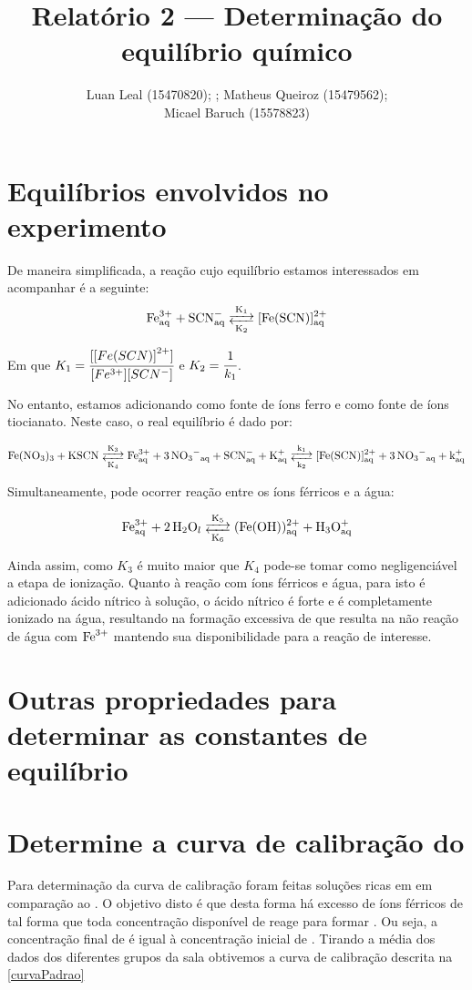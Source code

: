 \documentclass{article}
\author{Luan Leal (15470820);
; Matheus Queiroz (15479562);\\ Micael Baruch (15578823)}
\title{Relatório 2 --- Determinação do equilíbrio químico}
\begin{document}
\maketitle

\section{Equilíbrios envolvidos no experimento}

De maneira simplificada, a reação cujo equilíbrio estamos interessados em acompanhar é a seguinte:
\begin{align*}
    \ce{Fe^{3+}_{aq} + SCN^-_{aq} <-->[{K_1}][{K_2}] {[Fe(SCN)]}^{2+}_{aq}}
\end{align*}

Em que \(K_1 = \cfrac{[{[Fe(SCN)]}^{2+}]}{[Fe^{3+}][SCN^-]} \) e \(K_2 = \cfrac{1}{k_1}\).

No entanto, estamos adicionando  como fonte de íons ferro e  como fonte de íons tiocianato. Neste caso, o real equilíbrio é dado por:

\begin{align*}
    \ce{Fe(NO3)3 + KSCN <-->[{K_3}][{K_4}] Fe^{3+}_{aq} + 3NO3^-_{aq} + SCN^-_{aq} + K^+_{aq} <-->[{k_1}][{k_2}] {[Fe(SCN)]}^{2+}_{aq} + 3NO3^-_{aq} + k^+_{aq}}
\end{align*}

Simultaneamente, pode ocorrer reação entre os íons férricos e a água:

\begin{align*}
    \ce{Fe^{3+}_{aq} + 2H2O_l <-->[{K_5}][{K_6}] {(Fe(OH))}^{2+}_{aq} + H3O^+_{aq}}
\end{align*}

Ainda assim, como \(K_3\) é muito maior que \(K_4\) pode-se tomar como negligenciável a etapa de ionização. Quanto à reação com íons férricos e água, para isto é adicionado ácido nítrico à solução, o ácido nítrico é forte e é completamente ionizado na água, resultando na formação excessiva de   que resulta na não reação de água com \(\ce{Fe^{3+}}\) mantendo sua disponibilidade para a reação de interesse.   

\section{Outras propriedades para determinar as constantes de equilíbrio}

\section{Determine a curva de calibração do }
Para determinação da curva de calibração foram feitas soluções ricas em  em comparação ao . O objetivo disto é que desta forma há excesso de íons férricos de tal forma que toda concentração disponível de  reage para formar . Ou seja, a concentração final de  é igual à concentração inicial de . Tirando a média dos dados dos diferentes grupos da sala obtivemos a curva de calibração descrita na \cref{curvaPadrao}
\end{document}
